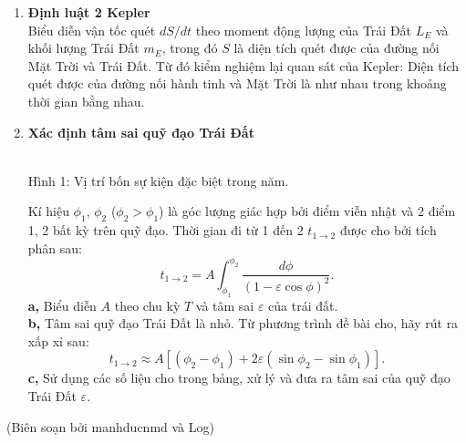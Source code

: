 \begin{enumerate}[label=\textbf{\arabic*,}]\itemsep0em 
        \item \textbf{Định luật 2 Kepler} \\
        Biểu diễn vận tốc quét \(dS/dt\) theo moment động lượng của Trái Đất \(L_E\) và khối lượng Trái Đất \(m_E\), trong đó \(S\) là diện tích quét được của đường nối Mặt Trời và Trái Đất. Từ đó kiểm nghiệm lại quan sát của Kepler: Diện tích quét được của đường nối hành tinh và Mặt Trời là như nhau trong khoảng thời gian bằng nhau.
        \item \textbf{Xác định tâm sai quỹ đạo Trái Đất}
\vspace{-0.8cm}
\begin{center}
\begin{minipage}{\textwidth}
\centering
{}
\end{minipage} \\
\vspace{2mm}
Hình 1: Vị trí bốn sự kiện đặc biệt trong năm.
\end{center}
Kí hiệu \(\phi_1\), \(\phi_2\) (\(\phi_2 > \phi_1\)) là góc lượng giác hợp bởi điểm viễn nhật và 2 điểm 1, 2 bất kỳ trên quỹ đạo. Thời gian đi từ 1 đến 2 \(t_{1 \rightarrow 2}\) được cho bởi tích phân sau:
\begin{equation*}
    t_{1 \rightarrow 2} = A \int_{\phi_1}^{\phi_2} \frac{d\phi}{(1-\varepsilon \cos{\phi})^2}.
\end{equation*}
\textbf{a,} Biểu diễn \(A\) theo chu kỳ \(T\) và tâm sai \(\varepsilon\) của trái đất. \\
\textbf{b,} Tâm sai quỹ đạo Trái Đất là nhỏ. Từ phương trình đề bài cho, hãy rút ra xấp xỉ sau:
\begin{equation*}
    t_{1 \rightarrow 2} \approx A[(\phi_2 - \phi_1) + 2\varepsilon(\sin{\phi_2} - \sin{\phi_1})].
\end{equation*}
\textbf{c,} Sử dụng các số liệu cho trong bảng, xử lý và đưa ra tâm sai của quỹ đạo Trái Đất \(\varepsilon\).
\end{enumerate}

\begin{flushright}
    (Biên soạn bởi manhducnmd và Log)
\end{flushright}